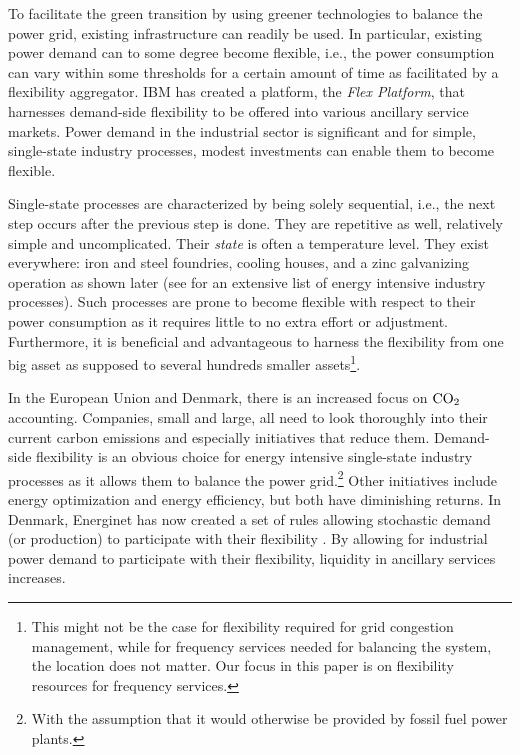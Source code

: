 \documentclass[sigconf]{acmart}
\begin{document}
To facilitate the green transition by using greener technologies to balance the power grid, existing infrastructure can readily be used. In particular, existing power demand can to some degree become flexible, i.e., the power consumption can vary within some thresholds for a certain amount of time as facilitated by a flexibility aggregator. IBM has created a platform, the \textit{Flex Platform}, that harnesses demand-side flexibility to be offered into various ancillary service markets. Power demand in the industrial sector is significant and for simple, single-state industry processes, modest investments can enable them to become flexible.

Single-state processes are characterized by being solely sequential, i.e., the next step occurs after the previous step is done. They are repetitive as well, relatively simple and uncomplicated. Their \textit{state} is often a temperature level. They exist everywhere: iron and steel foundries, cooling houses, and a zinc galvanizing operation as shown later (see \cite{paulus2011potential} for an extensive list of energy intensive industry processes). Such processes are prone to become flexible with respect to their power consumption as it requires little to no extra effort or adjustment. Furthermore, it is beneficial and advantageous to harness the flexibility from one big asset as supposed to several hundreds smaller assets\footnote{This might not be the case for flexibility required for grid congestion management, while for frequency services needed for balancing the system, the location does not matter. Our focus in this paper is on flexibility resources for frequency services.}.

In the European Union and Denmark, there is an increased focus on $\rm{CO_{2}}$ accounting. Companies, small and large, all need to look thoroughly into their current carbon emissions and especially initiatives that reduce them. Demand-side flexibility is an obvious choice for energy intensive single-state industry processes as it allows them to balance the power grid.\footnote{With the assumption that it would otherwise be provided by fossil fuel power plants.} Other initiatives include energy optimization and energy efficiency, but both have diminishing returns. In Denmark, Energinet has now created a set of rules allowing stochastic demand (or production) to participate with their flexibility \cite{energinet:prequalification}. By allowing for industrial power demand to participate with their flexibility, liquidity in ancillary services increases.
\end{document}
